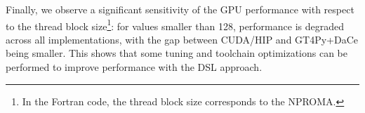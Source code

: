 \documentclass[main.tex]{subfiles}
\begin{document}
        Finally, we observe a significant sensitivity of the GPU performance with respect to the thread block size\footnote{In the Fortran code, the thread block size corresponds to the NPROMA.}: for values smaller than 128, performance is degraded across all implementations, with the gap between CUDA/HIP and GT4Py+DaCe being smaller. This shows that some tuning and toolchain optimizations can be performed to improve performance with the DSL approach.

\end{document}
